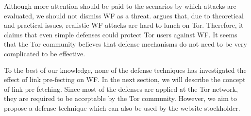 Although more attention should be paid to the scenarios by which attacks are evaluated, we should not dismiss WF as a threat. \cite{TorBlog} argues that, due to theoretical and practical issues, realistic WF attacks are hard to lunch on Tor. Therefore, it claims that even simple defenses could protect Tor users against WF. It seems that the Tor community believes that defense mechanisms do not need to be very complicated to be effective.

To the best of our knowledge, none of the defense techniques has investigated the effect of link pre-fecting on WF. In the next section, we will describe the concept of link pre-fetching. Since most of the defenses are applied at the Tor network, they are required to be acceptable by the Tor community. However, we aim to propose a defense technique which can also be used by the website stockholder. 

